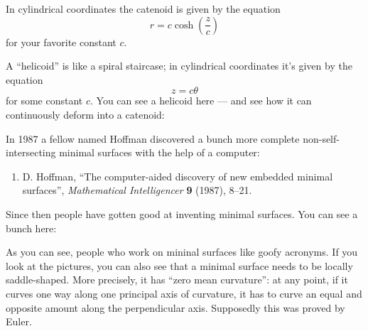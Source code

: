 \documentclass{article}
\def\tightlist{}
\renewcommand{\texttt}[1]{%
  \begingroup
  \ttfamily
  \begingroup\lccode`~=`/\lowercase{\endgroup\def~}{/\discretionary{}{}{}}%
  \begingroup\lccode`~=`[\lowercase{\endgroup\def~}{[\discretionary{}{}{}}%
  \begingroup\lccode`~=`.\lowercase{\endgroup\def~}{.\discretionary{}{}{}}%
  \catcode`/=\active\catcode`[=\active\catcode`.=\active
  \scantokens{#1\noexpand}%
  \endgroup
}
\begin{document}

In cylindrical coordinates the catenoid is given by the equation
\[r = c \cosh\left(\frac{z}{c}\right)\] for your favorite constant
\(c\).

A ``helicoid'' is like a spiral staircase; in cylindrical coordinates
it's given by the equation \[z = c\theta\] for some constant \(c\). You
can see a helicoid here --- and see how it can continuously deform into
a catenoid:


In 1987 a fellow named Hoffman discovered a bunch more complete
non-self-intersecting minimal surfaces with the help of a computer:

\begin{enumerate}
\def\labelenumi{\arabic{enumi})}
\setcounter{enumi}{7}
\tightlist
\item
  D. Hoffman, ``The computer-aided discovery of new embedded minimal
  surfaces'', \emph{Mathematical Intelligencer} \textbf{9} (1987),
  8--21.
\end{enumerate}

Since then people have gotten good at inventing minimal surfaces. You
can see a bunch here:


As you can see, people who work on mininal surfaces like goofy acronyms.
If you look at the pictures, you can also see that a minimal surface
needs to be locally saddle-shaped. More precisely, it has ``zero mean
curvature'': at any point, if it curves one way along one principal axis
of curvature, it has to curve an equal and opposite amount along the
perpendicular axis. Supposedly this was proved by Euler.
\end{document}
